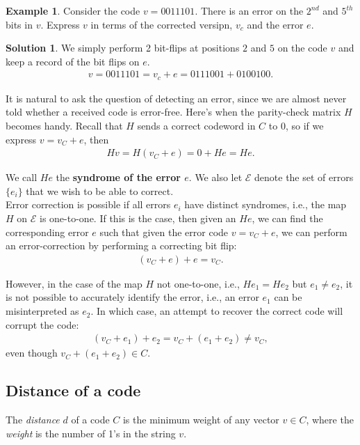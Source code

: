\documentclass{article}
\theoremstyle{definition}
\newtheorem{exmp}{Example}[section]
\newtheorem{sln}{Solution}[section]
\begin{document}
\begin{exmp}
	Consider the code $v = 0011101$. There is an error on the $2^{nd}$ and $5^{th}$ bits in $v$. Express $v$ in terms of the corrected versipn, $v_c$ and the error $e$.\\
	
	\begin{sln}
		We simply perform 2 bit-flips at positions $2$ and $5$ on the code $v$ and keep a record of the bit flips on $e$.
		\begin{align}
		v = 0011101 = v_c + e = 0111001 + 0100100.
		\end{align}
	\end{sln}
\end{exmp}


It is natural to ask the question of detecting an error, since we are almost never told whether a received code is error-free. Here's when the parity-check matrix $H$ becomes handy. Recall that $H$ sends a correct codeword in $C$ to 0, so if we express $v = v_C + e$, then
\begin{align}
Hv = H(v_C + e) = 0 + He = He.
\end{align} 

We call $He$ the \textbf{syndrome of the error $e$}. We also let $\mathcal{E}$ denote the set of errors $\{e_i\}$ that we wish to be able to correct. \\

Error correction is possible if all errors $e_i$ have distinct syndromes, i.e., the map $H$ on $\mathcal{E}$ is one-to-one. If this is the case, then given an $He$, we can find the corresponding error $e$ such that given the error code $v = v_C + e$, we can perform an error-correction by performing a correcting bit flip:
\begin{align}
(v_C + e) + e = v_C.
\end{align}

However, in the case of the map $H$ not one-to-one, i.e., $He_1 = He_2$ but $e_1 \neq e_2$, it is not possible to accurately identify the error, i.e., an error $e_1$ can be misinterpreted as $e_2$. In which case, an attempt to recover the correct code will corrupt the code:
\begin{align}
(v_C + e_1) + e_2 = v_C + (e_1 + e_2) \neq v_C,
\end{align} 
even though $v_C + (e_1 + e_2) \in C$. 

\subsection{Distance of a code}
The \textit{distance} $d$ of a code $C$ is the minimum weight of any vector $v\in C$, where the \textit{weight} is the number of 1's in the string $v$.\\
\end{document}
